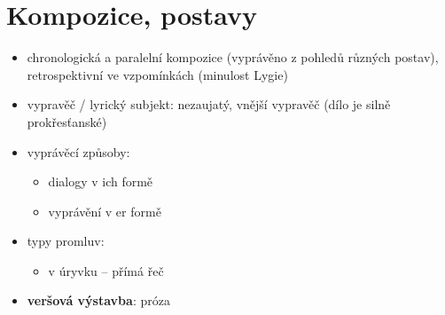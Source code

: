 \documentclass[10pt,a4paper]{article}
\begin{document}
\section*{Kompozice, postavy}
\begin{itemize}
\item chronologická a paralelní kompozice (vyprávěno z pohledů různých postav), retrospektivní ve vzpomínkách (minulost Lygie)
\item vypravěč / lyrický subjekt: nezaujatý, vnější vypravěč (dílo je silně prokřesťanské)
\item vyprávěcí způsoby:
	\begin{itemize}
	\item dialogy v ich formě
	\item vyprávění v er formě
	\end{itemize}
\item typy promluv:
	\begin{itemize}
	\item v úryvku -- přímá řeč
	\end{itemize}
\item \textbf{veršová výstavba}: próza
\end{itemize}
\end{document}
